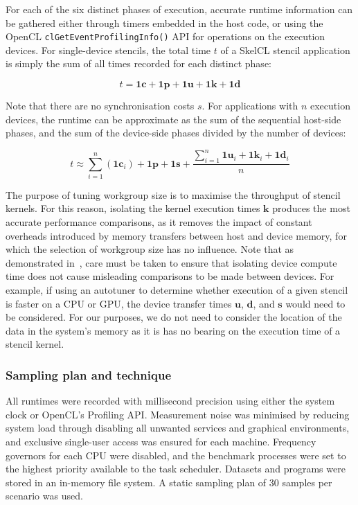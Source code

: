 For each of the six distinct phases of execution, accurate runtime
information can be gathered either through timers embedded in the host
code, or using the OpenCL \texttt{clGetEventProfilingInfo()} API for
operations on the execution devices. For single-device stencils, the
total time $t$ of a SkelCL stencil application is simply the sum of
all times recorded for each distinct phase:

\begin{equation}
t = \bm{1c} + \bm{1p} + \bm{1u} + \bm{1k} + \bm{1d}
\end{equation}

Note that there are no synchronisation costs $s$. For applications
with $n$ execution devices, the runtime can be approximate as the sum
of the sequential host-side phases, and the sum of the device-side
phases divided by the number of devices:

\begin{equation}
t \approx \sum_{i=1}^n{(\bm{1c}_{i})} + \bm{1p} + \bm{1s} +
  \frac{\sum_{i=1}^n{\bm{1u}_{i} + \bm{1k}_{i} + \bm{1d}_{i}}}{n}
\end{equation}


The purpose of tuning workgroup size is to maximise the throughput of
stencil kernels. For this reason, isolating the kernel execution times
$\bm{k}$ produces the most accurate performance comparisons, as it
removes the impact of constant overheads introduced by memory
transfers between host and device memory, for which the selection of
workgroup size has no influence. Note that as demonstrated
in~\cite{Gregg2011}, care must be taken to ensure that isolating
device compute time does not cause misleading comparisons to be made
between devices. For example, if using an autotuner to determine
whether execution of a given stencil is faster on a CPU or GPU, the
device transfer times $\bm{u}$, $\bm{d}$, and $\bm{s}$ would need to
be considered. For our purposes, we do not need to consider the
location of the data in the system's memory as it is has no bearing on
the execution time of a stencil kernel.


\subsubsection{Sampling plan and technique}

All runtimes were recorded with millisecond precision using either the
system clock or OpenCL's Profiling API. Measurement noise was
minimised by reducing system load through disabling all unwanted
services and graphical environments, and exclusive single-user access
was ensured for each machine. Frequency governors for each CPU were
disabled, and the benchmark processes were set to the highest priority
available to the task scheduler. Datasets and programs were stored in
an in-memory file system. A static sampling plan of 30 samples per
scenario was used.  


